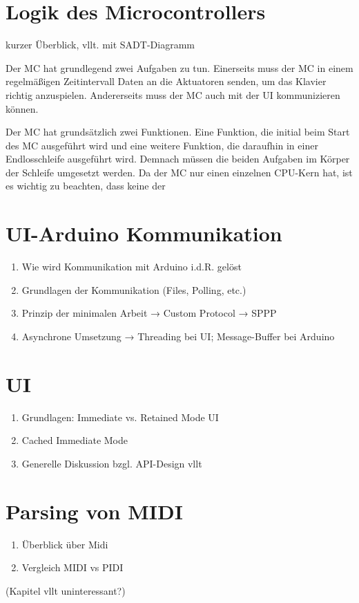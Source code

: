 \section{Logik des Microcontrollers} \label{vorgehenSW-MC}
kurzer Überblick, vllt. mit SADT-Diagramm

Der \ac{MC} hat grundlegend zwei Aufgaben zu tun.
Einerseits muss der \ac{MC} in einem regelmäßigen Zeitintervall Daten an die Aktuatoren senden, um das Klavier richtig anzuspielen.
Andererseits muss der \ac{MC} auch mit der \ac{UI} kommunizieren können.

Der \ac{MC} hat grundsätzlich zwei Funktionen.
Eine Funktion, die initial beim Start des \ac{MC} ausgeführt wird und eine weitere Funktion, die daraufhin in einer Endlosschleife ausgeführt wird.
Demnach müssen die beiden Aufgaben im Körper der Schleife umgesetzt werden.
Da der \ac{MC} nur einen einzelnen CPU-Kern hat, ist es wichtig zu beachten, dass keine der


\section{UI-Arduino Kommunikation} \label{vorgehenSW-SPPP}
\begin{enumerate}
    \item Wie wird Kommunikation mit Arduino i.d.R. gelöst
    \item Grundlagen der Kommunikation (Files, Polling, etc.)
    \item Prinzip der minimalen Arbeit → Custom Protocol → SPPP
    \item Asynchrone Umsetzung → Threading bei UI; Message-Buffer bei Arduino
\end{enumerate}

\section{UI} \label{vorgehenSW-UI}
\begin{enumerate}
    \item Grundlagen: Immediate vs. Retained Mode UI
    \item Cached Immediate Mode
    \item Generelle Diskussion bzgl. API-Design vllt
\end{enumerate}

\section{Parsing von MIDI} \label{vorgehenSW-MIDI}
\begin{enumerate}
    \item Überblick über Midi
    \item Vergleich MIDI vs PIDI
\end{enumerate}
(Kapitel vllt uninteressant?)